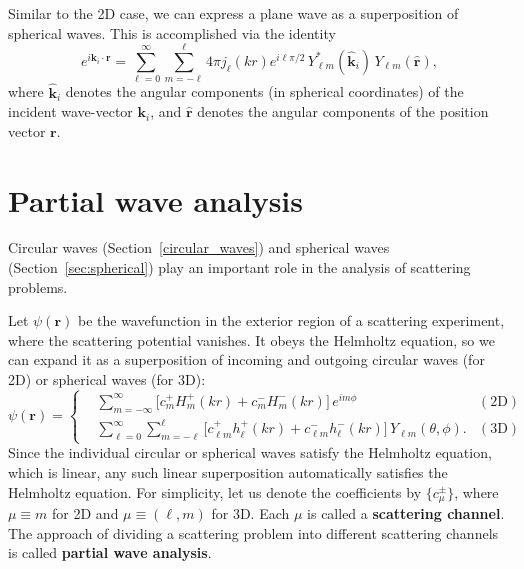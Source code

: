 \documentclass[prx,12pt]{revtex4-2}
\begin{document}
Similar to the 2D case, we can express a plane wave as a superposition
of spherical waves.  This is accomplished via the identity
\begin{equation}
  e^{i\mathbf{k}_i \cdot \mathbf{r}}
  = \sum_{\ell=0}^\infty \sum_{m=-\ell}^\ell 4 \pi j_{\ell}(kr) e^{i\ell\pi/2} \,
  Y_{\ell m}^*(\hat{\mathbf{k}}_i) \, Y_{\ell m}(\hat{\mathbf{r}}),
  \label{plane_wave_decomp}
\end{equation}
where $\hat{\mathbf{k}}_i$ denotes the angular components (in
spherical coordinates) of the incident wave-vector $\mathbf{k}_i$, and
$\hat{\mathbf{r}}$ denotes the angular components of the position
vector $\mathbf{r}$.

\section{Partial wave analysis}
\label{sec:scattering}

Circular waves (Section~\ref{circular_waves}) and spherical waves
(Section~\ref{sec:spherical}) play an important role in the analysis
of scattering problems.

Let $\psi(\mathbf{r})$ be the wavefunction in the exterior region of a
scattering experiment, where the scattering potential vanishes.  It
obeys the Helmholtz equation, so we can expand it as a superposition
of incoming and outgoing circular waves (for 2D) or spherical waves
(for 3D):
\begin{equation}
  \psi(\mathbf{r}) =
  \left\{
  \begin{aligned}
    &\sum_{m=-\infty}^\infty
    \Big[c_m^+ H_m^+(kr) + c_m^- H_m^-(kr)\Big] \, e^{im\phi}
    & (\textrm{2D})
    \\
    &\sum_{\ell = 0}^\infty \sum_{m = - \ell}^\ell
    \Big[c_{\ell m}^+ h_\ell^+(kr) + c_{\ell m}^- h_\ell^-(kr)\Big] \,
    Y_{\ell m}(\theta, \phi). & (\textrm{3D})
  \end{aligned}\right.
  \label{psirdecomp}
\end{equation}
Since the individual circular or spherical waves satisfy the Helmholtz
equation, which is linear, any such linear superposition automatically
satisfies the Helmholtz equation.  For simplicity, let us denote the
coefficients by $\{c_\mu^\pm\}$, where $\mu \equiv m$ for 2D and $\mu
\equiv (\ell, m)$ for 3D.  Each $\mu$ is called a \textbf{scattering
  channel}.  The approach of dividing a scattering problem into
different scattering channels is called \textbf{partial wave
  analysis}.
\end{document}
